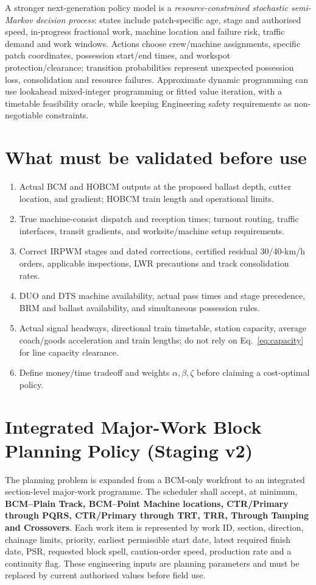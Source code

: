 \documentclass[10pt,a4paper]{article}
\begin{document}
A stronger next-generation policy model is a \emph{resource-constrained stochastic semi-Markov decision process}: states include patch-specific age, stage and authorised speed, in-progress fractional work, machine location and failure risk, traffic demand and work windows. Actions choose crew/machine assignments, specific patch coordinates, possession start/end times, and workspot protection/clearance; transition probabilities represent unexpected possession loss, consolidation and resource failures. Approximate dynamic programming can use lookahead mixed-integer programming or fitted value iteration, with a timetable feasibility oracle, while keeping Engineering safety requirements as non-negotiable constraints.

\section{What must be validated before use}
\begin{enumerate}\item Actual BCM and HOBCM outputs at the proposed ballast depth, cutter location, and gradient; HOBCM train length and operational limits.
\item True machine-consist dispatch and reception times; turnout routing, traffic interfaces, transit gradients, and worksite/machine setup requirements.
\item Correct IRPWM stages and dated corrections, certified residual 30/40-km/h orders, applicable inspections, LWR precautions and track consolidation rates.
\item DUO and DTS machine availability, actual pass times and stage precedence, BRM and ballast availability, and simultaneous possession rules.
\item Actual signal headways, directional train timetable, station capacity, average coach/goods acceleration and train lengths; do not rely on Eq.~\ref{eq:capacity} for line capacity clearance.
\item Define money/time tradeoff and weights $\alpha,\beta,\zeta$ before claiming a cost-optimal policy.
\end{enumerate}

\section{Integrated Major-Work Block Planning Policy (Staging v2)}
The planning problem is expanded from a BCM-only workfront to an integrated section-level major-work programme. The scheduler shall accept, at minimum, \textbf{BCM--Plain Track, BCM--Point Machine locations, CTR/Primary through PQRS, CTR/Primary through TRT, TRR, Through Tamping and Crossovers}. Each work item is represented by work ID, section, direction, chainage limits, priority, earliest permissible start date, latest required finish date, PSR, requested block spell, caution-order speed, production rate and a continuity flag. These engineering inputs are planning parameters and must be replaced by current authorised values before field use.
\end{document}
